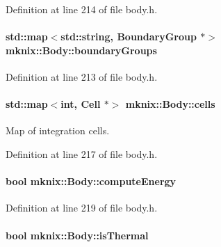 Definition at line 214 of file body.\+h.

\hypertarget{classmknix_1_1_body_a36b757c3483aa0a65c064e2be0919bb0}{}
\paragraph[{boundary\+Groups}]{\setlength{\rightskip}{0pt plus 5cm}std\+::map$<$std\+::string, {\bf Boundary\+Group} $\ast$$>$ mknix\+::\+Body\+::boundary\+Groups\hspace{0.3cm}{\ttfamily [protected]}}\label{classmknix_1_1_body_a36b757c3483aa0a65c064e2be0919bb0}


Definition at line 213 of file body.\+h.

\hypertarget{classmknix_1_1_body_ae42afe33182ecd4ab758fd252e079221}{}
\paragraph[{cells}]{\setlength{\rightskip}{0pt plus 5cm}std\+::map$<$int, {\bf Cell} $\ast$$>$ mknix\+::\+Body\+::cells\hspace{0.3cm}{\ttfamily [protected]}}\label{classmknix_1_1_body_ae42afe33182ecd4ab758fd252e079221}
Map of integration cells. 

Definition at line 217 of file body.\+h.

\hypertarget{classmknix_1_1_body_a64fa35111fa3252c60971811dec421de}{}
\paragraph[{compute\+Energy}]{\setlength{\rightskip}{0pt plus 5cm}bool mknix\+::\+Body\+::compute\+Energy\hspace{0.3cm}{\ttfamily [protected]}}\label{classmknix_1_1_body_a64fa35111fa3252c60971811dec421de}


Definition at line 219 of file body.\+h.

\hypertarget{classmknix_1_1_body_a2b8de3291a8b2678b1c989f4d6c52b89}{}
\paragraph[{is\+Thermal}]{\setlength{\rightskip}{0pt plus 5cm}bool mknix\+::\+Body\+::is\+Thermal\hspace{0.3cm}{\ttfamily [protected]}}\label{classmknix_1_1_body_a2b8de3291a8b2678b1c989f4d6c52b89}


